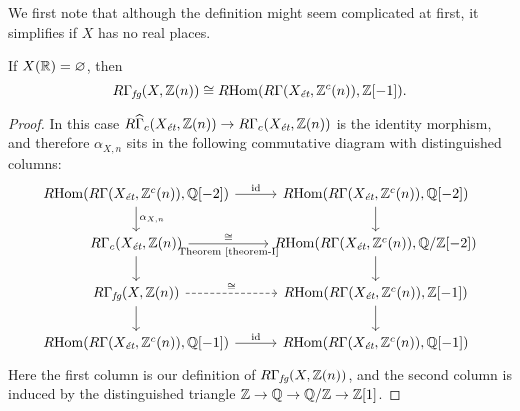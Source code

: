 \documentclass{article}
\numberwithin{equation}{section}
\begin{document}
We first note that although the definition might seem complicated at first,
it simplifies if $X$ has no real places.

\begin{proposition}
  \label{prop:RGamma-fg-for-X(R)-empty}
  If $X (\RR) = \emptyset$, then
  \[ R\Gamma_\fg (X, \ZZ (n)) \cong
    \RHom (R\Gamma (X_\et, \ZZ^c (n)), \ZZ [-1]). \]

  \begin{proof}
    In this case
    $R\widehat{\Gamma}_c (X_\et, \ZZ (n)) \to R\Gamma_c (X_\et, \ZZ (n))$
    is the identity morphism, and therefore $\alpha_{X,n}$ sits in the following
    commutative diagram with distinguished columns:
    \[ \begin{tikzcd}
      \RHom (R\Gamma (X_\et, \ZZ^c (n)), \QQ [-2])\ar{d}{\alpha_{X,n}} \ar{r}{\mathrm{id}} & \RHom (R\Gamma (X_\et, \ZZ^c (n)), \QQ [-2])\ar{d} \\
      R\Gamma_c (X_\et, \ZZ (n))\ar{d} \ar{r}{\cong}[swap]{\text{Theorem~\ref{theorem-I}}} & \RHom (R\Gamma (X_\et, \ZZ^c (n)), \QQ/\ZZ [-2])\ar{d} \\
      R\Gamma_\fg (X, \ZZ (n))\ar{d} \ar[dashed]{r}{\cong} & \RHom (R\Gamma (X_\et, \ZZ^c (n)), \ZZ [-1])\ar{d} \\
      \RHom (R\Gamma (X_\et, \ZZ^c (n)), \QQ [-1]) \ar{r}{\mathrm{id}} & \RHom (R\Gamma (X_\et, \ZZ^c (n)), \QQ [-1])
    \end{tikzcd} \]
    Here the first column is our definition of $R\Gamma_\fg (X, \ZZ (n))$,
    and the second column is induced by the distinguished triangle
    $\ZZ \to \QQ \to \QQ/\ZZ \to \ZZ [1]$.
  \end{proof}
\end{proposition}
\end{document}
